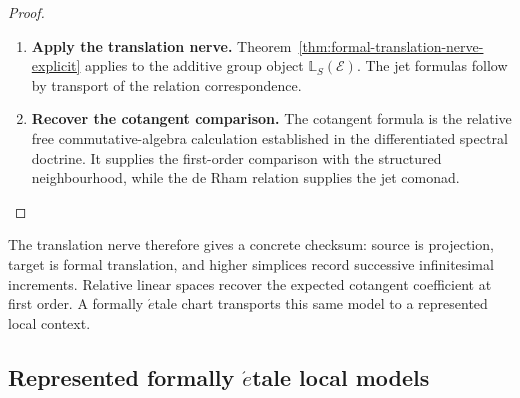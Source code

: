 \begin{proof}
\leavevmode
\begin{enumerate}[label=\textup{(\arabic*)}]
    \item \textbf{Apply the translation nerve.}
Theorem~\ref{thm:formal-translation-nerve-explicit} applies to the additive
group object \(\mathbb L_S(\mathcal E)\). The jet formulas follow by transport of the
relation correspondence.

    \item \textbf{Recover the cotangent comparison.}
The cotangent formula is the relative free
commutative-algebra calculation established in the differentiated spectral
doctrine. It supplies the first-order comparison with the structured
neighbourhood, while the de Rham relation supplies the jet comonad.
\end{enumerate}
\end{proof}

The translation nerve therefore gives a concrete checksum: source is projection,
target is formal translation, and higher simplices record successive
infinitesimal increments. Relative linear spaces recover the expected
cotangent coefficient at first order. A formally \(\acute{e}\)tale chart
transports this same model to a represented local context.

\subsection{Represented formally \texorpdfstring{$\acute{e}$}{e}tale local models}
\label{sec:represented-jet-interface}

